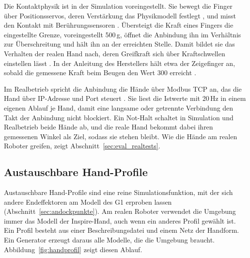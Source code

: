Die Kontaktphysik ist in der Simulation voreingestellt.
Sie bewegt die Finger über Positionsservos, deren Verstärkung das Physikmodell festlegt \cite{MujocoDoku2026b}, und misst den Kontakt mit Berührungssensoren \cite{MujocoDoku2026a}.
Übersteigt die Kraft eines Fingers die eingestellte Grenze, voreingestellt 500\,g, öffnet die Anbindung ihn im Verhältnis zur Überschreitung und hält ihn an der erreichten Stelle.
Damit bildet sie das Verhalten der realen Hand nach, deren Greifkraft sich über Kraftschwellen einstellen lässt \cite{Inspire2024}.
In der Anleitung des Herstellers hält etwa der Zeigefinger an, sobald die gemessene Kraft beim Beugen den Wert 300 erreicht \cite{Inspire2024}.

Im Realbetrieb spricht die Anbindung die Hände über Modbus TCP an, das die Hand über IP-Adresse und Port steuert \cite{Inspire2024}.
Sie liest die Istwerte mit 20\,Hz in einem eigenen Ablauf je Hand, damit eine langsame oder getrennte Verbindung den Takt der Anbindung nicht blockiert.
Ein Not-Halt schaltet in Simulation und Realbetrieb beide Hände ab, und die reale Hand bekommt dabei ihren gemessenen Winkel als Ziel, sodass sie stehen bleibt.
Wie die Hände am realen Roboter greifen, zeigt Abschnitt~\ref{sec:eval_realtests}.

\subsection{Austauschbare Hand-Profile}
\label{sec:hand_profile}
Austauschbare Hand-Profile sind eine reine Simulationsfunktion, mit der sich andere Endeffektoren am Modell des G1 erproben lassen (Abschnitt~\ref{sec:andockpunkte}).
Am realen Roboter verwendet die Umgebung immer das Modell der Inspire-Hand, auch wenn ein anderes Profil gewählt ist.
Ein Profil besteht aus einer Beschreibungsdatei und einem Netz der Handform. Ein Generator erzeugt daraus alle Modelle, die die Umgebung braucht.
Abbildung~\ref{fig:handprofil} zeigt diesen Ablauf.

